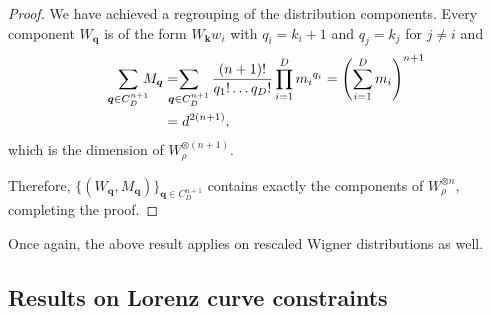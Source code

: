 \documentclass[
twocolumn,
superscriptaddress
]{revtex4-1}
\def\q{\boldsymbol{q}}
\def\k{\boldsymbol{k}}
\def\q{\boldsymbol{q}}
\begin{document}
\begin{proof}
We have achieved a regrouping of the distribution components.
Every component $W_{\q}$ is of the form $W_{\k} w_i$ with $q_i = k_i + 1$ and $q_j = k_j$ for $j\neq i$ and 
\begin{align*}
	\sum_{\q \in C_D^{n+1}}  \hspace{-6pt} M_{\q} &=  \hspace{-10pt} \sum_{\q \in C_D^{n+1}} \frac{(n+1)!}{q_1!\dots q_D!} \prod\limits_{i=1}^D {m_i}^{q_i} = \left( \sum_{i=1}^D m_i \right)^{n+1} \hspace{-10pt} \\
	&= d^{2(n+1)},
\end{align*}
which is the dimension of $W_{\rho}^{\otimes (n+1)}$.

Therefore, $\{ (W_{\q}, M_{\q}) \}_{\q \in C_D^{n+1}}$ contains exactly the components of $W_{\rho}^{\otimes n}$, completing the proof.
\end{proof}
Once again, the above result applies on rescaled Wigner distributions as well.

\subsection*{Results on Lorenz curve constraints}
\end{document}
